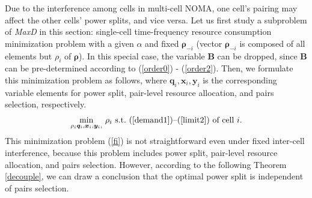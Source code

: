 \documentclass[10pt,journal,final,finalsubmission,twocolumn]{IEEEtran}
\begin{document}
Due to the interference among cells in multi-cell NOMA, one cell's pairing may affect the other cells' power splits, and vice versa. Let us first study a subproblem of {\em MaxD} in this section: single-cell time-frequency resource consumption minimization problem with a given $\alpha$ and fixed $\boldsymbol{\rho}_{-i}$ (vector $\boldsymbol{\rho}_{-i}$ is composed of all elements but $\rho_i$ of $\boldsymbol{\rho}$). In this special case, the variable $\boldsymbol{B}$ can be dropped, since $\boldsymbol{B}$ can be pre-determined according to (\ref{order0}) - (\ref{order2}). Then, we formulate this minimization problem as follows, where $\boldsymbol{q}_i,\boldsymbol{x}_i,\boldsymbol{y}_i$ is the corresponding variable elements for power split, pair-level resource allocation, and pairs selection, respectively.
\begin{equation}\label{fi}
 \underset{\rho_i \boldsymbol{q}_i,\boldsymbol{x}_i,\boldsymbol{y}_i,}{\min} \  \rho_i \ \textup{s.t.\ (\ref{demand1})--(\ref{limit2}) of cell $i$} .
\end{equation}
This minimization problem (\ref{fi}) is not straightforward even under fixed inter-cell interference, because this problem includes power split,  pair-level resource allocation, and pairs selection. However, according to the following Theorem \ref{decouple}, we can draw a conclusion that the optimal power split is independent of pairs selection.
\end{document}
